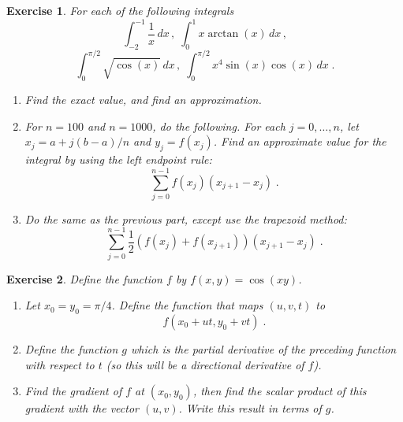 \documentclass{article}
\newtheorem{exo}{Exercise}[section]
\begin{document}
\begin{exo}{\rm
For each of the following integrals
\[
\int_{-2}^{-1}\frac{1}{x}\,dx\,,\;
\int_0^1 x\arctan(x)\,dx\,,
\]
\[
\int_0^{\pi/2} \sqrt{\cos(x)}\,dx\,,\;
\int_0^{\pi/2} x^4\sin(x)\cos(x)\,dx\;.
\] 
\begin{enumerate}
\item
Find the exact value, and find an approximation.
\item
For $n=100$ and $n=1000$, do the following.
For each $j=0,\ldots,n$, let $x_j=a+j(b-a)/n$ and $y_j=f(x_j)$.
Find an approximate value for the integral by using the left endpoint
rule:
\[
\sum_{j=0}^{n-1} f(x_j)(x_{j+1}-x_j)\;.
\]
\item
Do the same as the previous part, except use the trapezoid
method:
\[
\sum_{j=0}^{n-1} \frac{1}{2}(f(x_j)+f(x_{j+1}))(x_{j+1}-x_j)\;.
\]
\end{enumerate}
}\end{exo}
\begin{exo}{\rm
Define the function $f$ by 
$f(x,y)=\cos(xy)$.
\begin{enumerate}
\item
Let $x_0=y_0=\pi/4$. Define the function that maps $(u,v,t)$ to
\[f(x_0+ut,y_0+vt)\;.\]
\item
Define the function $g$ which is the partial derivative of the
preceding function with respect to $t$ (so this will be a directional
derivative of $f$).
\item
Find the gradient of $f$ at $(x_0,y_0)$, then find the scalar product
of this gradient with the vector $(u,v)$.  Write this result in terms
of $g$.
\end{enumerate}
}\end{exo}
\end{document}
